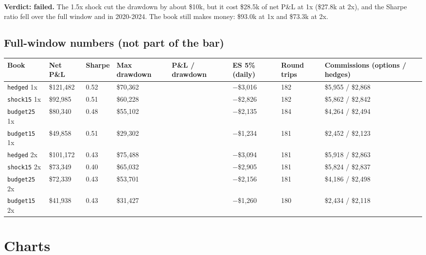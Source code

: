 \documentclass{article}
\begin{document}
\textbf{Verdict: failed.} The 1.5x shock cut the drawdown by about \$10k, but it cost \$28.5k of net P\&L at 1x (\$27.8k at 2x), and the Sharpe ratio fell over the full window and in 2020-2024. The book still makes money: \$93.0k at 1x and \$73.3k at 2x.

\subsection{Full-window numbers (not part of the bar)}

\begin{center}\small
\begin{tabularx}{\linewidth}{>{\raggedright\arraybackslash}X l l l >{\raggedright\arraybackslash}X >{\raggedright\arraybackslash}X l >{\raggedright\arraybackslash}X}
\toprule
\textbf{Book} & \textbf{Net P\&L} & \textbf{Sharpe} & \textbf{Max drawdown} & \textbf{P\&L /\allowbreak{} drawdown} & \textbf{ES 5\% (daily)} & \textbf{Round trips} & \textbf{Commissions (options /\allowbreak{} hedges)} \\
\midrule
\texttt{hedged} 1x & \$121,482 & 0.52 & \$70,362 & 1.73 & \ensuremath{-}\$3,016 & 182 & \$5,955 /\allowbreak{} \$2,868 \\
\texttt{shock15} 1x & \$92,985 & 0.51 & \$60,228 & 1.54 & \ensuremath{-}\$2,826 & 182 & \$5,862 /\allowbreak{} \$2,842 \\
\texttt{budget25} 1x & \$80,340 & 0.48 & \$55,102 & 1.46 & \ensuremath{-}\$2,135 & 184 & \$4,264 /\allowbreak{} \$2,494 \\
\texttt{budget15} 1x & \$49,858 & 0.51 & \$29,302 & 1.70 & \ensuremath{-}\$1,234 & 181 & \$2,452 /\allowbreak{} \$2,123 \\
\texttt{hedged} 2x & \$101,172 & 0.43 & \$75,488 & 1.34 & \ensuremath{-}\$3,094 & 181 & \$5,918 /\allowbreak{} \$2,863 \\
\texttt{shock15} 2x & \$73,349 & 0.40 & \$65,032 & 1.13 & \ensuremath{-}\$2,905 & 181 & \$5,824 /\allowbreak{} \$2,837 \\
\texttt{budget25} 2x & \$72,339 & 0.43 & \$53,701 & 1.35 & \ensuremath{-}\$2,156 & 181 & \$4,186 /\allowbreak{} \$2,498 \\
\texttt{budget15} 2x & \$41,938 & 0.43 & \$31,427 & 1.33 & \ensuremath{-}\$1,260 & 180 & \$2,434 /\allowbreak{} \$2,118 \\
\bottomrule
\end{tabularx}
\end{center}

\section{Charts}
\end{document}
